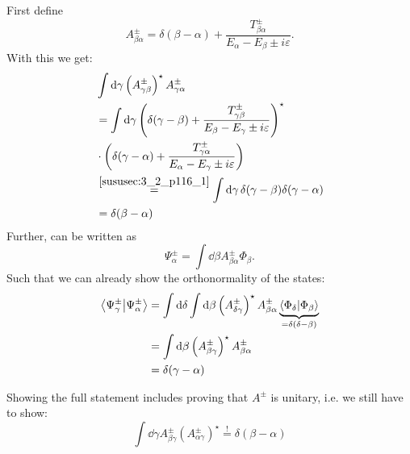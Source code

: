 First define \[A_{\beta\alpha}^\pm=\delta(\beta-\alpha)+\dfrac{T_{\beta\alpha}^\pm}{E_\alpha-E_\beta\pm i \varepsilon}.\]
With this we get:
\begin{align*}
	&\int\dd{\gamma} \left(A_{\gamma\beta}^\pm\right)^\star A_{\gamma\alpha}^\pm\\
	&=\int\dd{\gamma}\left(\delta(\gamma-\beta)+\dfrac{T_{\gamma\beta}^\pm}{E_\beta-E_\gamma\pm i \varepsilon}\right)^\star\\
	&\cdot\left(\delta(\gamma-\alpha)+\dfrac{T_{\gamma\alpha}^\pm}{E_\alpha-E_\gamma\pm i \varepsilon}\right)\\
	&\overset{\ref{sususec:3_2_p116_1}}{=}\int\dd{\gamma}\delta(\gamma-\beta)\delta(\gamma-\alpha)\\
	&=\delta(\beta-\alpha)
\end{align*}
Further,  can be written as
\[\Psi_\alpha^\pm=\int\dd{\beta}A_{\beta\alpha}^\pm\Phi_\beta.\]
Such that we can already show the orthonormality of the states:
\begin{align}
	\braket{\Psi_\gamma^\pm}{\Psi_\alpha^\pm}&=\int\dd{\delta}\int\dd{\beta} \left(A_{\delta\gamma}^\pm\right)^\star A_{\beta\alpha}^\pm\underbrace{\braket{\Phi_\delta}{\Phi_\beta}}_{=\delta(\delta-\beta)}\nonumber\\
	&=\int\dd{\beta} \left(A_{\beta\gamma}^\pm\right)^\star A_{\beta\alpha}^\pm\nonumber\\
	&=\delta(\gamma-\alpha)\label{eq_3_B_4}
\end{align}

Showing the full statement includes proving that $A^\pm$ is unitary, i.e. we still have to show:
\[\int\dd{\gamma} A_{\beta\gamma}^\pm \left(A_{\alpha\gamma}^\pm\right)^\star\overset{!}{=}\delta(\beta-\alpha)\]

